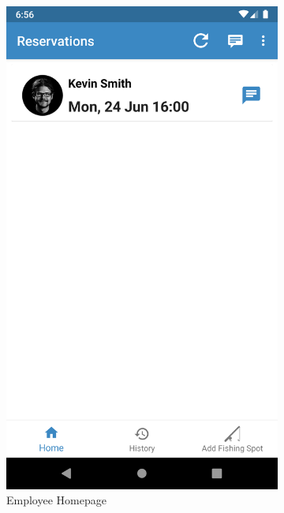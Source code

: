 \begin{figure}[h]
\centering
\begin{subfigure}{.5\textwidth}
  \centering
  \includegraphics[height=.5\textheight, keepaspectratio=true]{Img/EmployeeHome}
  \caption{Employee Homepage}
\end{subfigure}%
\begin{subfigure}{.5\textwidth}
  \centering

\end{subfigure}
\end{figure}

